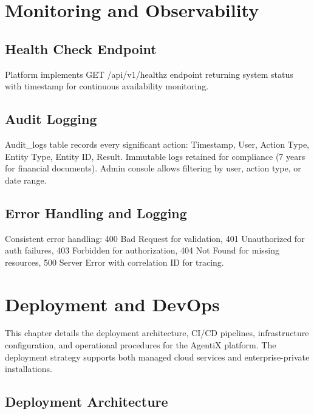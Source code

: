 \documentclass[12pt,oneside,openright,a4paper]{cpe-english-project}
\begin{document}
\vspace{1em}

\section{Monitoring and Observability}

\subsection{Health Check Endpoint}

Platform implements GET /api/v1/healthz endpoint returning system status with timestamp for continuous availability monitoring.

\subsection{Audit Logging}

Audit\_logs table records every significant action: Timestamp, User, Action Type, Entity Type, Entity ID, Result. Immutable logs retained for compliance (7 years for financial documents). Admin console allows filtering by user, action type, or date range.

\subsection{Error Handling and Logging}

Consistent error handling: 400 Bad Request for validation, 401 Unauthorized for auth failures, 403 Forbidden for authorization, 404 Not Found for missing resources, 500 Server Error with correlation ID for tracing.

\section{Deployment and DevOps}

This chapter details the deployment architecture, CI/CD pipelines, infrastructure configuration, and operational procedures for the AgentiX platform. The deployment strategy supports both managed cloud services and enterprise-private installations.

\vspace{1em}

\subsection{Deployment Architecture}
\end{document}
